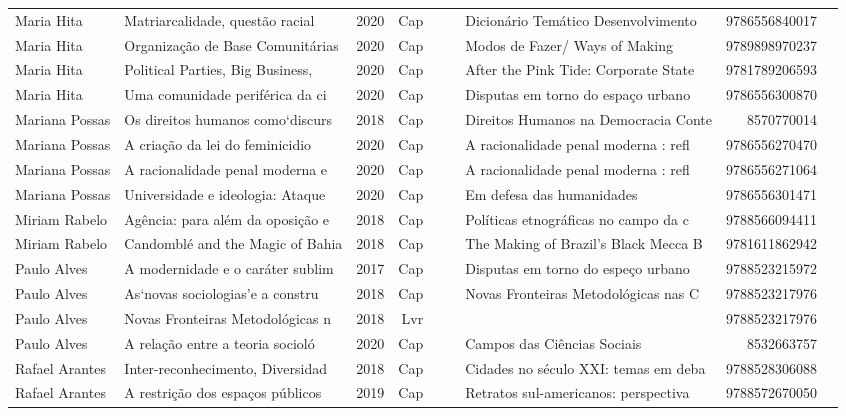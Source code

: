 \documentclass[12pt,brazil]{article}\usepackage[]{graphicx}\usepackage[]{xcolor}
\begin{document}
\begin{longtable}{lllrrllrr}
Maria Hita & Matriarcalidade, questão racial  & 2020 & Cap &  &  & Dicionário Temático Desenvolvimento  & 9786556840017 \\
Maria Hita & Organização de Base Comunitárias & 2020 & Cap &  &  & Modos de Fazer/ Ways of Making & 9789898970237 \\
Maria Hita & Political Parties, Big Business, & 2020 & Cap &  &  & After the Pink Tide: Corporate State & 9781789206593 \\
Maria Hita & Uma comunidade periférica da ci & 2020 & Cap &  &  & Disputas em torno do espaço urbano  & 9786556300870 \\
Mariana Possas & Os direitos humanos como‘discurs & 2018 & Cap &  &  & Direitos Humanos na Democracia Conte & 8570770014 \\
Mariana Possas & A criação da lei do feminicidio  & 2020 & Cap &  &  & A racionalidade penal moderna : refl & 9786556270470 \\
Mariana Possas & A racionalidade penal moderna e  & 2020 & Cap &  &  & A racionalidade penal moderna : refl & 9786556271064 \\
\rowcolor{coautr}Mariana Possas & Universidade e ideologia: Ataque & 2020 & Cap &  &  & Em defesa das humanidades & 9786556301471 \\
\rowcolor{coautr}Miriam Rabelo & Agência: para além da oposição e & 2018 & Cap &  &  & Políticas etnográficas no campo da c & 9788566094411 \\
Miriam Rabelo & Candomblé and the Magic of Bahia & 2018 & Cap &  &  & The Making of Brazil’s Black Mecca B & 9781611862942 \\
Paulo Alves & A modernidade e o caráter sublim & 2017 & Cap &  &  & Disputas em torno do espeço urbano & 9788523215972 \\
\rowcolor{capdup}Paulo Alves & As‘novas sociologias’e a constru & 2018 & Cap &  &  & Novas Fronteiras Metodológicas nas C & 9788523217976 \\
Paulo Alves & Novas Fronteiras Metodológicas n & 2018 & Lvr &  &  &  & 9788523217976 \\
Paulo Alves & A relação entre a teoria socioló & 2020 & Cap &  &  & Campos das Ciências Sociais & 8532663757 \\
Rafael Arantes & Inter-reconhecimento, Diversidad & 2018 & Cap &  &  & Cidades no século XXI: temas em deba & 9788528306088 \\
Rafael Arantes & A restrição dos espaços públicos & 2019 & Cap &  &  & Retratos sul-americanos: perspectiva & 9788572670050 \\

\end{longtable}
\end{document}
